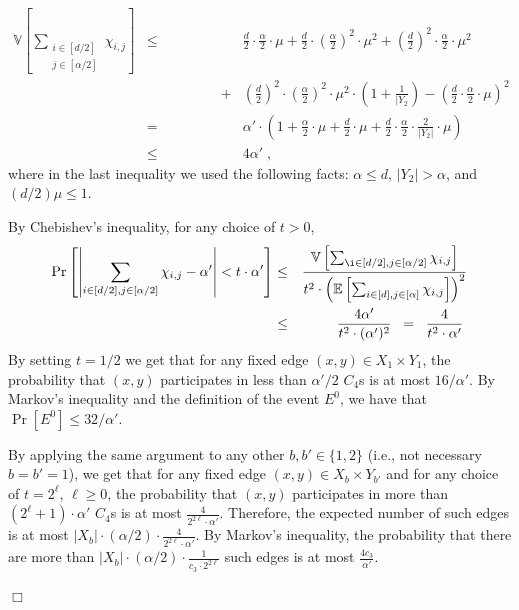 \documentclass{article}
\newcommand{\Ex}{\mathbb{E}}
\newcommand{\Var}{\mathbb{V}}
\newenvironment{proofof}[1]{\smallskip\noindent{\bf Proof of #1:}}%
        {\hspace*{\fill}$\Box$\par}
\newcommand{\commentt}[1]{ {}}
\begin{document}
\begin{proofof}{Claim~\ref{clm:Pr-Es}}
\begin{eqnarray}
\Var\left[\sum_{\substack{i\in [d/2] \\ j\in [\alpha/2]}}\chi_{i,j}\right]
&\leq& \frac{d}{2}\cdot\frac{\alpha}{2}\cdot\mu
+ \frac{d}{2}\cdot \left(\frac{\alpha}{2}\right)^2 \cdot \mu^2 + \left(\frac{d}{2}\right)^2\cdot \frac{\alpha}{2}\cdot \mu^2 \nonumber \\
&\;\;\;\;\;\;\;\;\;\;\;\;\;\;\;\;\;\;\;+& \left(\frac{d}{2}\right)^2\cdot \left(\frac{\alpha}{2}\right)^2 \cdot \mu^2\cdot \left(1+\frac{1}{|Y_2}\right) - \left(\frac{d}{2}\cdot\frac{\alpha}{2}\cdot \mu\right)^2 \nonumber \\
&=& \alpha'\cdot
\left( 1+ \frac{\alpha}{2}\cdot\mu + \frac{d}{2}\cdot \mu + \frac{d}{2}\cdot \frac{\alpha}{2}\cdot \frac{2}{|Y_2|}\cdot \mu\right)\nonumber \\
&\leq& 4\alpha' \;,
\end{eqnarray}
where in the last inequality we used the following facts: $\alpha \leq d$, $|Y_2|> \alpha$, and
$(d/2)\mu \leq 1$.

By Chebishev's inequality,
for any choice of $t>0$,
\begin{eqnarray}
\Pr\left[\left|\sum_{i\in [d/2],j\in [\alpha/2]}\chi_{i,j} - \alpha'\right|< t\cdot \alpha' \right] &\leq& \frac{\Var\left[\sum_{\i\in [d/2],j\in [\alpha/2]}\chi_{i,j}\right]}{t^2\cdot \left(\Ex\left[\sum_{i\in [d],j\in [\alpha]} \chi_{i,j}\right]\right)^2} \\
&\leq& \frac{4\alpha'}{t^2 \cdot (\alpha')^2}
\;\;= \;\;\frac{4}{t^2\cdot \alpha'}\;
\label{eq:C4-lb-cheb2}
\end{eqnarray}
By setting $t=1/2$ we get that for any fixed edge $(x,y)\in X_1\times Y_1$, the probability that $(x,y)$ participates in less than $\alpha'/2$ $C_4$s is at most $16/\alpha'$. By Markov's inequality and the definition of the event $E^0$, we have that
$\Pr[E^0] \leq 32/\alpha'$.

By applying the same argument to any other $b,b' \in \{1,2\}$ (i.e., not necessary $b=b'=1$), we get that
for any fixed edge $(x,y)\in X_b\times Y_{b'}$ and for
any choice of $t = 2^{\ell}$, $\ell \geq 0$,
 the probability that $(x,y)$ participates in more  than $(2^\ell +1)\cdot \alpha'$ $C_4$s is at most $\frac{4}{2^{2\ell}\cdot \alpha'}$.
Therefore, the expected number of such edges is at most
$|X_b|\cdot (\alpha/2)\cdot \frac{4}{2^{2\ell}\cdot \alpha'}$. By Markov's inequality, the probability that there are more than
$ |X_b|\cdot (\alpha/2)\cdot \frac{1}{c_3\cdot 2^{2\ell}}$ such edges is at most $\frac{4c_3}{\alpha'}$.


\end{proofof}
\end{document}
